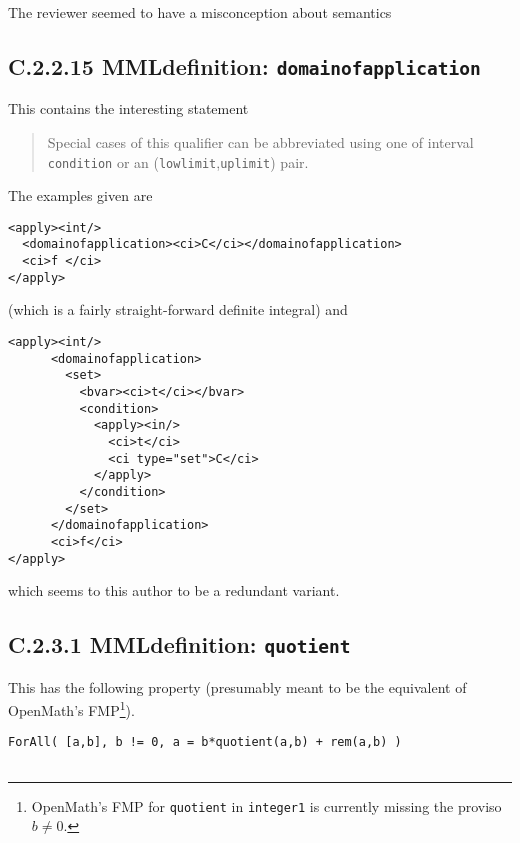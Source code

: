 \documentclass{llncs}
\begin{document}
\begin{newpart}{The reviewer seemed to have a misconception about semantics}
\subsection{C.2.2.15 MMLdefinition: {\tt domainofapplication}}\label{C2215}
This contains the interesting statement
\begin{quotation}\noindent
Special cases of this qualifier can be abbreviated using one of interval
{\tt condition} or an ({\tt lowlimit},{\tt uplimit}) pair.
\end{quotation}
The examples given are
\begin{lstlisting}[language=MathML2]
<apply><int/>
  <domainofapplication><ci>C</ci></domainofapplication>
  <ci>f </ci>
</apply>
\end{lstlisting}
(which is a fairly straight-forward definite integral) and
\begin{lstlisting}[language=MathML2]
<apply><int/>
      <domainofapplication>
        <set>
          <bvar><ci>t</ci></bvar>
          <condition>
            <apply><in/>
              <ci>t</ci>
              <ci type="set">C</ci>
            </apply>
          </condition>
        </set>
      </domainofapplication>
      <ci>f</ci>
</apply>
\end{lstlisting}
which seems to this author to be a redundant variant. 
\subsection{C.2.3.1 MMLdefinition: {\tt quotient}}\label{C231}
This has the following property (presumably meant to be the equivalent of
OpenMath's FMP\footnote{OpenMath's FMP for {\tt quotient} in {\tt integer1} is
currently missing the proviso $b\ne0$.}).
\begin{lstlisting}[language=MathML2]
ForAll( [a,b], b != 0, a = b*quotient(a,b) + rem(a,b) )


\end{lstlisting}
\end{newpart}
\end{document}
